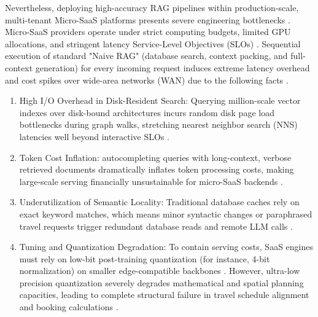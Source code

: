 \documentclass{ieeeaccess}
\begin{document}
Nevertheless, deploying high-accuracy RAG pipelines within production-scale, multi-tenant Micro-SaaS platforms presents severe engineering bottlenecks \cite{devalla-microservice-rag-2025}. Micro-SaaS providers operate under strict computing budgets, limited GPU allocations, and stringent latency Service-Level Objectives (SLOs) \cite{devalla-microservice-rag-2025, behera-optimizing-irjmets-2025}. Sequential execution of standard "Naive RAG" (database search, context packing, and full-context generation) for every incoming request induces extreme latency overhead and cost spikes over wide-area networks (WAN) due to the following facts \cite{ruan-asteria-2025, leveraging-approx-2025}.
\begin{enumerate}
    \item High I/O Overhead in Disk-Resident Search: Querying million-scale vector indexes over disk-bound architectures incurs random disk page load bottlenecks during graph walks, stretching nearest neighbor search (NNS) latencies well beyond interactive SLOs \cite{sun-gaussdb-vector-2025, leveraging-approx-2025}.
    \item Token Cost Inflation: autocompleting queries with long-context, verbose retrieved documents dramatically inflates token processing costs, making large-scale serving financially unsustainable for micro-SaaS backends \cite{hashemi-cost-aware-2025}.
    \item Underutilization of Semantic Locality: Traditional database caches rely on exact keyword matches, which means minor syntactic changes or paraphrased travel requests trigger redundant database reads and remote LLM calls \cite{ruan-asteria-2025, singh-krites-2026}.
    \item Tuning and Quantization Degradation: To contain serving costs, SaaS engines must rely on low-bit post-training quantization (for instance, 4-bit normalization) on smaller edge-compatible backbones \cite{dettmers-qlora-2024, huang-llama3-quant-2024}. However, ultra-low precision quantization severely degrades mathematical and spatial planning capacities, leading to complete structural failure in travel schedule alignment and booking calculations \cite{huang-llama3-quant-2024, li-quant-meets-reasoning-2025}.
\end{enumerate}
\end{document}

